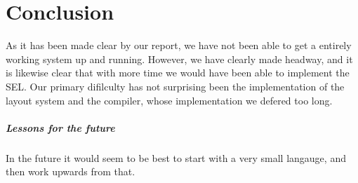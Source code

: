 \chapter*{Conclusion}

As it has been made clear by our report, we have not been able to get
a entirely working system up and running. However, we have clearly
made headway, and it is likewise clear that with more time we would
have been able to implement the SEL. Our primary difilculty has not
surprising been the implementation of the layout system and the
compiler, whose implementation we defered too long. 

\paragraph{Lessons for the future}
In the future it would seem to be best to start with a very small
langauge, and then work upwards from that.

